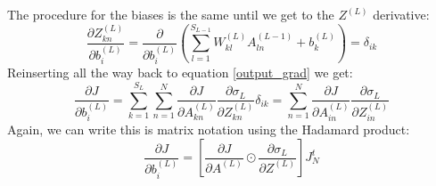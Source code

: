 \documentclass[12pt, a4paper]{article}
\numberwithin{equation}{section}
\begin{document}
The procedure for the biases is the same until we get to the $Z^{(L)}$ derivative:
\begin{equation}
\frac{\partial Z^{(L)}_{kn}}{\partial b^{(L)}_i}=\frac{\partial}{\partial b^{(L)}_i}\left(\sum_{l=1}^{S_{L-1}}W^{(L)}_{kl}A^{(L-1)}_{ln}+b^{(L)}_k\right)=\delta_{ik}
\end{equation}
Reinserting all the way back to equation \ref{output_grad} we get:
\begin{equation}
\frac{\partial J}{\partial b^{(L)}_i}=\sum_{k=1}^{S_L}\sum_{n=1}^N\frac{\partial J}{\partial A^{(L)}_{kn}}\frac{\partial\sigma_L}{\partial Z^{(L)}_{kn}}\delta_{ik}=\sum_{n=1}^N\frac{\partial J}{\partial A^{(L)}_{in}}\frac{\partial\sigma_L}{\partial Z^{(L)}_{in}}
\end{equation}
Again, we can write this is matrix notation using the Hadamard product:
\begin{equation}
\label{output_bias_matrix}
\frac{\partial J}{\partial b^{(L)}_i}=\left[\frac{\partial J}{\partial A^{(L)}}\odot\frac{\partial\sigma_L}{\partial Z^{(L)}}\right]J_N^t
\end{equation}
\end{document}
